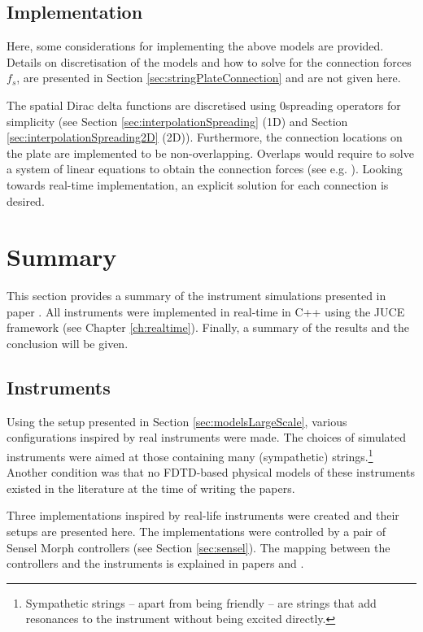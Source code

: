 \subsection{Implementation}
Here, some considerations for implementing the above models are provided. Details on discretisation of the models and how to solve for the connection forces $f_s$, are presented in Section \ref{sec:stringPlateConnection} and are not given here. 

The spatial Dirac delta functions are discretised using 0\thOrder spreading operators for simplicity (see Section \ref{sec:interpolationSpreading} (1D) and Section \ref{sec:interpolationSpreading2D} (2D)). Furthermore, the connection locations on the plate are implemented to be non-overlapping. Overlaps would require to solve a system of linear equations to obtain the connection forces (see e.g. \cite{Bilbao2009Modular}). Looking towards real-time implementation, an explicit solution for each connection is desired.

\section{Summary}
This section provides a summary of the instrument simulations presented in paper \citeP[A]. All instruments were implemented in real-time in C++ using the JUCE framework (see Chapter \ref{ch:realtime}). Finally, a summary of the results and the conclusion will be given.

\subsection{Instruments}\label{sec:largeScaleInstruments}
Using the setup presented in Section \ref{sec:modelsLargeScale}, various configurations inspired by real instruments were made. The choices of simulated instruments were aimed at those containing many (sympathetic) strings.\footnote{Sympathetic strings -- apart from being friendly -- are strings that add resonances to the instrument without being excited directly.} Another condition was that no FDTD-based physical models of these instruments existed in the literature at the time of writing the papers.

Three implementations inspired by real-life instruments were created and their setups are presented here. The implementations were controlled by a pair of Sensel Morph controllers (see Section \ref{sec:sensel}). The mapping between the controllers and the instruments is explained in papers \citeP[A] and \citeP[B].


